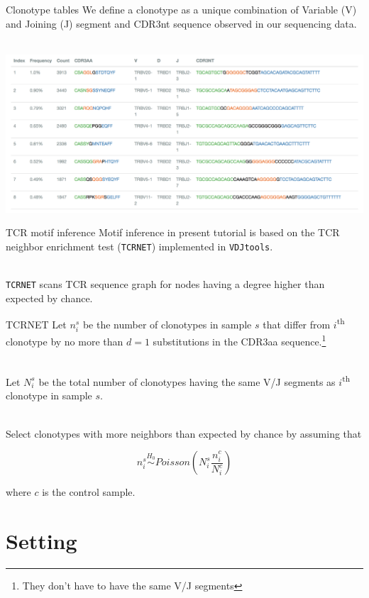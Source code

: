 \documentclass[12pt]{beamer}
\begin{document}
\begin{frame}{Clonotype tables}
We define a clonotype as a unique combination of Variable (V) and Joining (J) segment and CDR3nt sequence observed in our sequencing data.\\~\

\includegraphics[width=\textwidth]{clonotype_table}
\end{frame}

\begin{frame}{TCR motif inference}
Motif inference in present tutorial is based on the TCR neighbor enrichment test (\texttt{TCRNET}) implemented in \texttt{VDJtools}.\\~\

\texttt{TCRNET} scans TCR sequence graph for nodes having a degree higher than expected by chance.
\end{frame}

\begin{frame}{TCRNET}
Let $n_i^s$ be the number of clonotypes in sample $s$ that differ from $i$\textsuperscript{th} clonotype by no more than $d=1$ substitutions in the CDR3aa sequence.\footnote{They don't have to have the same V/J segments}\\~\

Let $N_i^s$ be the total number of clonotypes having the same V/J segments as $i$\textsuperscript{th} clonotype in sample $s$.\\~\

Select clonotypes with more neighbors than expected by chance by assuming that

\begin{equation}
n_i^s\stackrel{H_0}{\sim} Poisson\left(N_i^s\frac{n_i^c}{N_i^c}\right)
\end{equation}

where $c$ is the control sample.
\end{frame}

\section{Setting}
\end{document}
